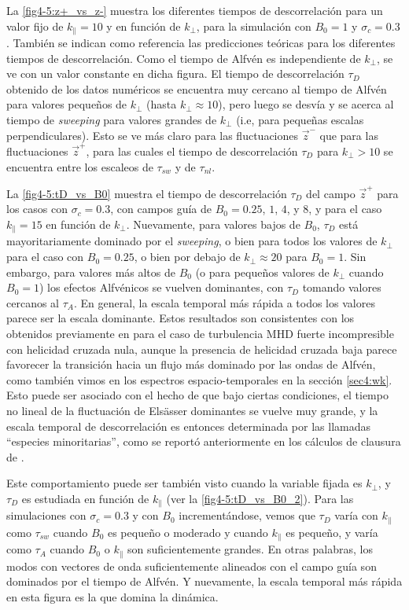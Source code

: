 La \cref{fig4-5:z+_vs_z-} muestra los diferentes tiempos de
descorrelación para un valor fijo de $k_{\parallel}=10$ y en función
de $k_{\perp}$, para la simulación con $B_0=1$ y
$\sigma_c=0.3$. También se indican como referencia las predicciones
teóricas para los diferentes tiempos de descorrelación. Como el tiempo
de Alfvén es independiente de $k_{\perp}$, se ve con un valor
constante en dicha figura. El tiempo de descorrelación $\tau_D$
obtenido de los datos numéricos se encuentra muy cercano al tiempo de
Alfvén para valores pequeños de $k_{\perp}$ (hasta $k_\perp \approx
10$), pero luego se desvía y se acerca al tiempo de \textit{sweeping} para
valores grandes de $k_{\perp}$ (i.e, para pequeñas escalas
perpendiculares). Esto se ve más claro para las fluctuaciones
$\vec{z}^-$ que para las fluctuaciones $\vec{z}^+$, para las cuales el
tiempo de descorrelación $\tau_D$ para $k_\perp > 10$ se encuentra
entre los escaleos de $\tau_{sw}$ y de $\tau_{nl}$.

La \cref{fig4-5:tD_vs_B0} muestra el tiempo de descorrelación $\tau_D$
del campo $\vec{z}^+$ para los casos con $\sigma_c = 0.3$, con campos
guía de $B_0=0.25$, $1$, $4$, y $8$, y para el caso $k_\parallel = 15$
en función de $k_\perp$.  Nuevamente, para valores bajos de $B_0$,
$\tau_D$ está mayoritariamente dominado por el \textit{sweeping}, o bien para
todos los valores de $k_\perp$ para el caso con $B_0=0.25$, o bien por
debajo de $k_\perp \approx 20$ para $B_0=1$. Sin embargo, para valores
más altos de $B_0$ (o para pequeños valores de $k_\perp$ cuando
$B_0=1$) los efectos Alfvénicos se vuelven dominantes, con $\tau_D$
tomando valores cercanos al $\tau_{A}$. En general, la escala temporal
más rápida a todos los valores parece ser la escala dominante. Estos
resultados son consistentes con los obtenidos previamente en
\cite{lugones_2016_spatiotemporal} para el caso de turbulencia MHD
fuerte incompresible con helicidad cruzada nula, aunque la presencia
de helicidad cruzada baja parece favorecer la transición
hacia un flujo más dominado por las ondas de Alfvén, como también
vimos en los espectros espacio-temporales en la sección
\ref{sec4:wk}. Esto puede ser asociado con el hecho de que bajo ciertas
condiciones, el tiempo no lineal de la fluctuación de Els\"asser
dominantes se vuelve muy grande, y la escala temporal de
descorrelación es entonces determinada por las llamadas ``especies
minoritarias'', como se reportó anteriormente en los cálculos de
clausura de \cite{grappin_1983_dependence}.

Este comportamiento puede ser también visto cuando la variable fijada
es $k_\perp$, y $\tau_D$ es estudiada en función de $k_\parallel$ (ver
la \cref{fig4-5:tD_vs_B0_2}). Para las simulaciones con $\sigma_c=0.3$ y
con $B_0$ incrementándose, vemos que $\tau_D$ varía con $k_\parallel$
como $\tau_{sw}$ cuando $B_0$ es pequeño o moderado y cuando
$k_\parallel$ es pequeño, y varía como $\tau_A$ cuando $B_0$ o
$k_\parallel$ son suficientemente grandes. En otras palabras, los
modos con vectores de onda suficientemente alineados con el campo guía
son dominados por el tiempo de Alfvén. Y nuevamente, la escala
temporal más rápida en esta figura es la que domina la dinámica.

